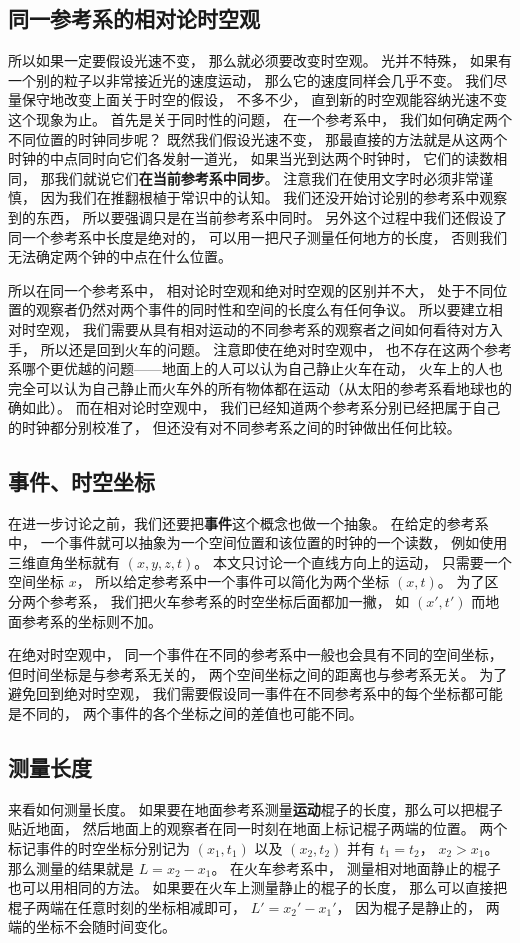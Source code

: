 \subsection{同一参考系的相对论时空观}
所以如果一定要假设光速不变， 那么就必须要改变时空观。 光并不特殊， 如果有一个别的粒子以非常接近光的速度运动， 那么它的速度同样会几乎不变。 我们尽量保守地改变上面关于时空的假设， 不多不少， 直到新的时空观能容纳光速不变这个现象为止。 首先是关于同时性的问题， 在一个参考系中， 我们如何确定两个不同位置的时钟同步呢？ 既然我们假设光速不变， 那最直接的方法就是从这两个时钟的中点同时向它们各发射一道光， 如果当光到达两个时钟时， 它们的读数相同， 那我们就说它们\textbf{在当前参考系中同步}。 注意我们在使用文字时必须非常谨慎， 因为我们在推翻根植于常识中的认知。 我们还没开始讨论别的参考系中观察到的东西， 所以要强调只是在当前参考系中同时。 另外这个过程中我们还假设了同一个参考系中长度是绝对的， 可以用一把尺子测量任何地方的长度， 否则我们无法确定两个钟的中点在什么位置。

所以在同一个参考系中， 相对论时空观和绝对时空观的区别并不大， 处于不同位置的观察者仍然对两个事件的同时性和空间的长度么有任何争议。 所以要建立相对时空观， 我们需要从具有相对运动的不同参考系的观察者之间如何看待对方入手， 所以还是回到火车的问题。 注意即使在绝对时空观中， 也不存在这两个参考系哪个更优越的问题——地面上的人可以认为自己静止火车在动， 火车上的人也完全可以认为自己静止而火车外的所有物体都在运动（从太阳的参考系看地球也的确如此）。 而在相对论时空观中， 我们已经知道两个参考系分别已经把属于自己的时钟都分别校准了， 但还没有对不同参考系之间的时钟做出任何比较。

\subsection{事件、时空坐标}
在进一步讨论之前，我们还要把\textbf{事件}这个概念也做一个抽象。 在给定的参考系中， 一个事件就可以抽象为一个空间位置和该位置的时钟的一个读数， 例如使用三维直角坐标就有 $(x, y, z, t)$。 本文只讨论一个直线方向上的运动， 只需要一个空间坐标 $x$， 所以给定参考系中一个事件可以简化为两个坐标 $(x, t)$。 为了区分两个参考系， 我们把火车参考系的时空坐标后面都加一撇， 如 $(x', t')$ 而地面参考系的坐标则不加。

在绝对时空观中， 同一个事件在不同的参考系中一般也会具有不同的空间坐标， 但时间坐标是与参考系无关的， 两个空间坐标之间的距离也与参考系无关。 为了避免回到绝对时空观， 我们需要假设同一事件在不同参考系中的每个坐标都可能是不同的， 两个事件的各个坐标之间的差值也可能不同。

\subsection{测量长度}
来看如何测量长度。 如果要在地面参考系测量\textbf{运动}棍子的长度，那么可以把棍子贴近地面， 然后地面上的观察者在同一时刻在地面上标记棍子两端的位置。 两个标记事件的时空坐标分别记为 $(x_1, t_1)$ 以及 $(x_2, t_2)$ 并有 $t_1 = t_2$， $x_2 > x_1$。 那么测量的结果就是 $L = x_2 - x_1$。 在火车参考系中， 测量相对地面静止的棍子也可以用相同的方法。 如果要在火车上测量静止的棍子的长度， 那么可以直接把棍子两端在任意时刻的坐标相减即可， $L' = x_2' - x_1'$， 因为棍子是静止的， 两端的坐标不会随时间变化。

